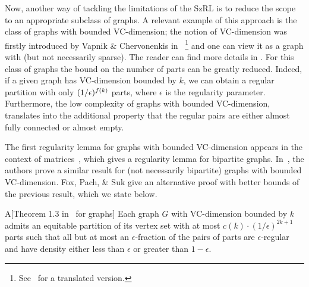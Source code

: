         Now, another way of tackling the limitations of the SzRL is to reduce the scope to an appropriate subclass of graphs.
        A relevant example of this approach is the class of graphs with bounded VC-dimension;
        the notion of VC-dimension was firstly introduced by Vapnik \& Chervonenkis
        in~\cite{the_uniform_convergence_of_frequencies_of_the_appearance_of_events_to_their_probabilities}
        \hspace{-3pt}\footnote{
            See~\cite{on_the_uniform_convergence_of_relative_frequencies_of_events_to_their_probabilities}
            for a translated version.}
        and one can view it as a graph with  (but not necessarily sparse).
        The reader can find more details in .
        For this class of graphs the bound on the number of parts can be greatly reduced.
        Indeed, if a given graph has VC-dimension bounded by $k$, we can obtain a regular partition with only
        $( {1}/{\epsilon} )^{f(k)}$ parts, where $\epsilon$ is the regularity parameter.
        Furthermore, the low complexity of graphs with bounded VC-dimension, translates into the additional property that the
        regular pairs are either almost fully connected or almost empty.

        The first regularity lemma for graphs with bounded VC-dimension appears in the context of
        matrices~\cite{efficient_testing_of_bipartite_graphs_for_forbidden_induced_subgraphs}, which gives
        a regularity lemma for bipartite graphs.
        In~\cite{regularity_partitions_and_the_topology_of_graphons}, the authors prove a similar result for
        (not necessarily bipartite) graphs with bounded VC-dimension.
        Fox, Pach, \& Suk give an alternative proof with better bounds of the previous result, which we state below.

        \begin{thm*}{A}[Theorem 1.3 in~\cite{erdos_hajnal_conjecture_for_graphs_with_bounded_vc_dimension} for graphs]
            \label{thm:A}
            Each graph $G$ with VC-dimension bounded by $k$ admits an equitable partition of its vertex set with at most
            $c(k)\cdot(1/\epsilon)^{2k+1}$ parts such that all but at most an $\epsilon$-fraction of the pairs of parts
            are $\epsilon$-regular and have density either less than $\epsilon$ or greater than $1 - \epsilon$.
        \end{thm*}

